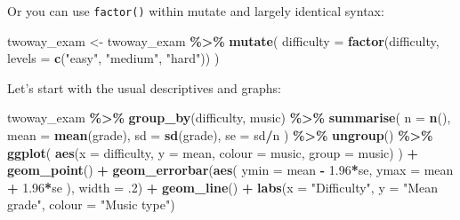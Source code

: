 \documentclass[
]{book}
\newenvironment{Shaded}{\begin{snugshade}}{\end{snugshade}}
\newcommand{\AttributeTok}[1]{\textcolor[rgb]{0.13,0.29,0.53}{#1}}
\newcommand{\DecValTok}[1]{\textcolor[rgb]{0.00,0.00,0.81}{#1}}
\newcommand{\FloatTok}[1]{\textcolor[rgb]{0.00,0.00,0.81}{#1}}
\newcommand{\FunctionTok}[1]{\textcolor[rgb]{0.13,0.29,0.53}{\textbf{#1}}}
\newcommand{\NormalTok}[1]{#1}
\newcommand{\OtherTok}[1]{\textcolor[rgb]{0.56,0.35,0.01}{#1}}
\newcommand{\SpecialCharTok}[1]{\textcolor[rgb]{0.81,0.36,0.00}{\textbf{#1}}}
\newcommand{\StringTok}[1]{\textcolor[rgb]{0.31,0.60,0.02}{#1}}
\begin{document}
\begin{Shaded}
\end{Shaded}

Or you can use \texttt{factor()} within mutate and largely identical syntax:

\begin{Shaded}
\begin{Highlighting}[]
\NormalTok{twoway\_exam }\OtherTok{\textless{}{-}}\NormalTok{ twoway\_exam }\SpecialCharTok{\%\textgreater{}\%}
  \FunctionTok{mutate}\NormalTok{(}
    \AttributeTok{difficulty =} \FunctionTok{factor}\NormalTok{(difficulty, }\AttributeTok{levels =} \FunctionTok{c}\NormalTok{(}\StringTok{"easy"}\NormalTok{, }\StringTok{"medium"}\NormalTok{, }\StringTok{"hard"}\NormalTok{))}
\NormalTok{  )}
\end{Highlighting}
\end{Shaded}

Let's start with the usual descriptives and graphs:

\begin{Shaded}
\begin{Highlighting}[]
\NormalTok{twoway\_exam }\SpecialCharTok{\%\textgreater{}\%}
  \FunctionTok{group\_by}\NormalTok{(difficulty, music) }\SpecialCharTok{\%\textgreater{}\%}
  \FunctionTok{summarise}\NormalTok{(}
    \AttributeTok{n =} \FunctionTok{n}\NormalTok{(),}
    \AttributeTok{mean =} \FunctionTok{mean}\NormalTok{(grade),}
    \AttributeTok{sd =} \FunctionTok{sd}\NormalTok{(grade),}
    \AttributeTok{se =}\NormalTok{ sd}\SpecialCharTok{/}\NormalTok{n}
\NormalTok{  ) }\SpecialCharTok{\%\textgreater{}\%}
  \FunctionTok{ungroup}\NormalTok{() }\SpecialCharTok{\%\textgreater{}\%}
  \FunctionTok{ggplot}\NormalTok{(}
    \FunctionTok{aes}\NormalTok{(}\AttributeTok{x =}\NormalTok{ difficulty, }\AttributeTok{y =}\NormalTok{ mean, }\AttributeTok{colour =}\NormalTok{ music, }\AttributeTok{group =}\NormalTok{ music) }
\NormalTok{  ) }\SpecialCharTok{+}
  \FunctionTok{geom\_point}\NormalTok{() }\SpecialCharTok{+}
  \FunctionTok{geom\_errorbar}\NormalTok{(}\FunctionTok{aes}\NormalTok{(}
    \AttributeTok{ymin =}\NormalTok{ mean }\SpecialCharTok{{-}} \FloatTok{1.96}\SpecialCharTok{*}\NormalTok{se,}
    \AttributeTok{ymax =}\NormalTok{ mean }\SpecialCharTok{+} \FloatTok{1.96}\SpecialCharTok{*}\NormalTok{se}
\NormalTok{  ), }\AttributeTok{width =}\NormalTok{ .}\DecValTok{2}\NormalTok{) }\SpecialCharTok{+}
  \FunctionTok{geom\_line}\NormalTok{() }\SpecialCharTok{+}
  \FunctionTok{labs}\NormalTok{(}\AttributeTok{x =} \StringTok{"Difficulty"}\NormalTok{, }\AttributeTok{y =} \StringTok{"Mean grade"}\NormalTok{, }\AttributeTok{colour =} \StringTok{"Music type"}\NormalTok{)}
\end{Highlighting}
\end{Shaded}
\end{document}
